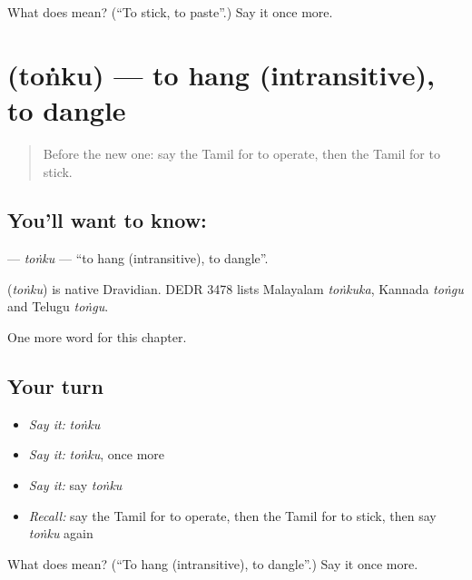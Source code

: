 \begin{tcolorbox}[breakable,colback=teal!4,colframe=teal!35!black,title={Before you move on}]
What does  mean? (\textquotedblleft{}To stick, to paste\textquotedblright{}.) Say it once more.
\end{tcolorbox}
\section[\texorpdfstring{\ta{தொங்கு} (toṅku)}{தொங்கு (toṅku)}]{ (toṅku) — to hang (intransitive), to dangle}

\label{lesson:TA-C167-tonku}



\begin{quote}
Before the new one: say the Tamil for to operate, then the Tamil for to stick.
\end{quote}

\subsection*{You'll want to know: }
\textbf{} — \emph{toṅku} — \textquotedblleft{}to hang (intransitive), to dangle\textquotedblright{}.

\begin{cousinweb}
\textbf{} (\emph{toṅku}) is native Dravidian. DEDR 3478 lists Malayalam \emph{toṅkuka}, Kannada \emph{toṅgu} and Telugu \emph{toṅgu}.
\end{cousinweb}

\begin{grammarlens}[title={What you've built}]
One more word for this chapter.
\end{grammarlens}

\subsection*{Your turn}
\begin{itemize}
\raggedright
  \item \emph{Say it:} \emph{toṅku}
  \item \emph{Say it:} \emph{toṅku}, once more
  \item \emph{Say it:} say \emph{toṅku}
  \item \emph{Recall:} say the Tamil for to operate, then the Tamil for to stick, then say \emph{toṅku} again
\end{itemize}

\begin{tcolorbox}[breakable,colback=teal!4,colframe=teal!35!black,title={Before you move on}]
What does  mean? (\textquotedblleft{}To hang (intransitive), to dangle\textquotedblright{}.) Say it once more.
\end{tcolorbox}
